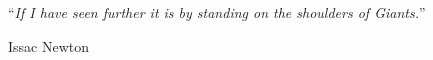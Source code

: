 \vspace*{0.2\textheight}

\noindent\enquote{\itshape If I have seen further it is by standing on the shoulders of Giants.}\bigbreak

\hfill Issac Newton